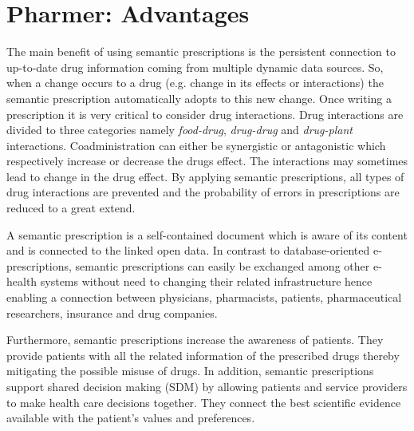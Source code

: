 \documentclass[conference]{IEEEtran}
\begin{document}
\section{Pharmer: Advantages}
\label{sec:benefits}

The main benefit of using semantic prescriptions is the persistent connection to up-to-date drug information coming from multiple dynamic data sources.
So, when a change occurs to a drug (e.g. change in its effects or interactions) the semantic prescription automatically adopts to this new change.
Once writing a prescription it is very critical to consider drug interactions.
Drug interactions are divided to three categories namely \emph{food-drug}, \emph{drug-drug} and \emph{drug-plant} interactions.
Coadministration can either be synergistic or antagonistic which respectively increase or decrease the drugs effect.
The interactions may sometimes lead to change in the drug effect.
By applying semantic prescriptions, all types of drug interactions are prevented and the probability of errors in prescriptions are reduced to a great extend.

A semantic prescription is a self-contained document which is aware of its content and is connected to the linked open data.
In contrast to database-oriented e-prescriptions, semantic prescriptions can easily be exchanged among other e-health systems without need to changing their related infrastructure hence enabling a connection between physicians, pharmacists, patients, pharmaceutical researchers, insurance and drug companies.

Furthermore, semantic prescriptions increase the awareness of patients.
They provide patients with all the related information of the prescribed drugs thereby mitigating the possible misuse of drugs.
In addition, semantic prescriptions support shared decision making (SDM) by allowing patients and service providers to make health care decisions together.
They connect the best scientific evidence available with the patient’s values and preferences.

\end{document}
